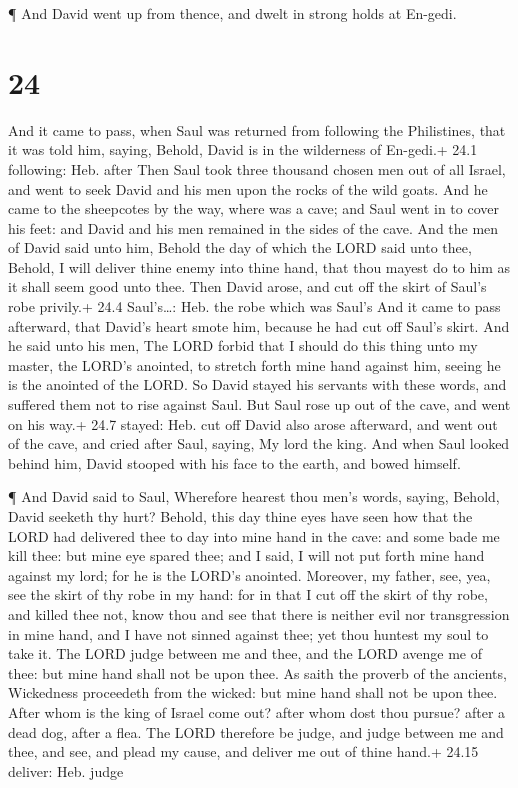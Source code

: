  ¶ And David went up from thence, and dwelt in strong holds
at En-gedi.

\hypertarget{section-23}{%
\section{24}\label{section-23}}

 And it came to pass, when Saul was returned from following
the Philistines, that it was told him, saying, Behold, David is in the
wilderness of En-gedi.+ 24.1 following: Heb. after  Then
Saul took three thousand chosen men out of all Israel, and went to seek
David and his men upon the rocks of the wild goats.  And he
came to the sheepcotes by the way, where was a cave; and Saul went in to
cover his feet: and David and his men remained in the sides of the cave.
 And the men of David said unto him, Behold the day of which
the LORD said unto thee, Behold, I will deliver thine enemy into thine
hand, that thou mayest do to him as it shall seem good unto thee. Then
David arose, and cut off the skirt of Saul's robe privily.+ 24.4
Saul's\ldots: Heb. the robe which was Saul's  And it came to
pass afterward, that David's heart smote him, because he had cut off
Saul's skirt.  And he said unto his men, The LORD forbid
that I should do this thing unto my master, the LORD's anointed, to
stretch forth mine hand against him, seeing he is the anointed of the
LORD.  So David stayed his servants with these words, and
suffered them not to rise against Saul. But Saul rose up out of the
cave, and went on his way.+ 24.7 stayed: Heb. cut off  David
also arose afterward, and went out of the cave, and cried after Saul,
saying, My lord the king. And when Saul looked behind him, David stooped
with his face to the earth, and bowed himself.

 ¶ And David said to Saul, Wherefore hearest thou men's
words, saying, Behold, David seeketh thy hurt?  Behold,
this day thine eyes have seen how that the LORD had delivered thee to
day into mine hand in the cave: and some bade me kill thee: but mine eye
spared thee; and I said, I will not put forth mine hand against my lord;
for he is the LORD's anointed.  Moreover, my father, see,
yea, see the skirt of thy robe in my hand: for in that I cut off the
skirt of thy robe, and killed thee not, know thou and see that there is
neither evil nor transgression in mine hand, and I have not sinned
against thee; yet thou huntest my soul to take it.  The
LORD judge between me and thee, and the LORD avenge me of thee: but mine
hand shall not be upon thee.  As saith the proverb of the
ancients, Wickedness proceedeth from the wicked: but mine hand shall not
be upon thee.  After whom is the king of Israel come out?
after whom dost thou pursue? after a dead dog, after a flea.
 The LORD therefore be judge, and judge between me and
thee, and see, and plead my cause, and deliver me out of thine hand.+
24.15 deliver: Heb. judge


